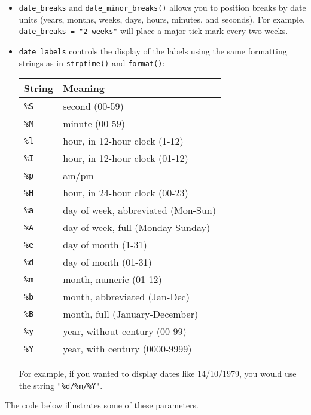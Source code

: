 \begin{itemize}
\item
  \texttt{date\_breaks} and \texttt{date\_minor\_breaks()} allows you to
  position breaks by date units (years, months, weeks, days, hours,
  minutes, and seconds). For example,
  \texttt{date\_breaks\ =\ "2\ weeks"} will place a major tick mark
  every two weeks.
\item
  \texttt{date\_labels} controls the display of the labels using the
  same formatting strings as in \texttt{strptime()} and
  \texttt{format()}:

  \begin{longtable}[]{@{}ll@{}}
  \toprule
  String & Meaning\tabularnewline
  \midrule
  \endhead
  \texttt{\%S} & second (00-59)\tabularnewline
  \texttt{\%M} & minute (00-59)\tabularnewline
  \texttt{\%l} & hour, in 12-hour clock (1-12)\tabularnewline
  \texttt{\%I} & hour, in 12-hour clock (01-12)\tabularnewline
  \texttt{\%p} & am/pm\tabularnewline
  \texttt{\%H} & hour, in 24-hour clock (00-23)\tabularnewline
  \texttt{\%a} & day of week, abbreviated (Mon-Sun)\tabularnewline
  \texttt{\%A} & day of week, full (Monday-Sunday)\tabularnewline
  \texttt{\%e} & day of month (1-31)\tabularnewline
  \texttt{\%d} & day of month (01-31)\tabularnewline
  \texttt{\%m} & month, numeric (01-12)\tabularnewline
  \texttt{\%b} & month, abbreviated (Jan-Dec)\tabularnewline
  \texttt{\%B} & month, full (January-December)\tabularnewline
  \texttt{\%y} & year, without century (00-99)\tabularnewline
  \texttt{\%Y} & year, with century (0000-9999)\tabularnewline
  \bottomrule
  \end{longtable}

  For example, if you wanted to display dates like 14/10/1979, you would
  use the string \texttt{"\%d/\%m/\%Y"}.
\end{itemize}

The code below illustrates some of these parameters.

\begin{Shaded}
\end{Shaded}

